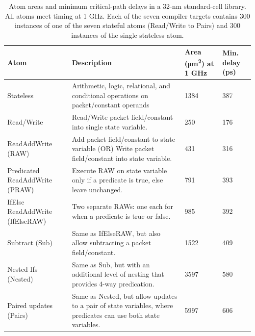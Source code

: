 \begin{table}[!t]
  \begin{scriptsize}
  \begin{tabular}{|p{}|p{}|p{}|p{}|}
    \hline
    Atom & Description & Area (\si{\micro\metre\squared}) at 1 GHz & Min. delay (ps) \\
    \hline
    Stateless & Arithmetic, logic, relational, and conditional operations on packet/constant operands & 1384 & 387 \\
    \hline
    Read/Write & Read/Write packet field/constant into single state variable. & 250 & 176 \\
    \hline
    ReadAddWrite (RAW) & Add packet field/constant to state variable (OR) Write packet field/constant into state variable. & 431 & 316 \\
    \hline
    Predicated ReadAddWrite (PRAW) & Execute RAW on state variable only if a predicate is true, else leave unchanged. & 791 & 393 \\
    \hline
    IfElse ReadAddWrite (IfElseRAW) & Two separate RAWs: one each for when a predicate is true or false. & 985 & 392 \\
    \hline
    Subtract (Sub) & Same as IfElseRAW, but also allow subtracting a packet field/constant. & 1522 & 409 \\
    \hline
    Nested Ifs (Nested) & Same as Sub, but with an additional level of nesting that provides 4-way predication. & 3597 & 580 \\
    \hline
    Paired updates (Pairs) & Same as Nested, but allow updates to a pair of state variables, where predicates can use both state variables. & 5997 & 606 \\
    \hline
  \end{tabular}
  \end{scriptsize}
  \caption{Atom areas and minimum critical-path delays in a 32-nm
  standard-cell library.  All atoms meet timing at 1 GHz. Each of the seven
  compiler targets contains 300 instances of one of the seven stateful atoms (Read/Write to Pairs)
  and 300 instances of the single stateless atom.}
  \label{tab:templates}
\end{table}

